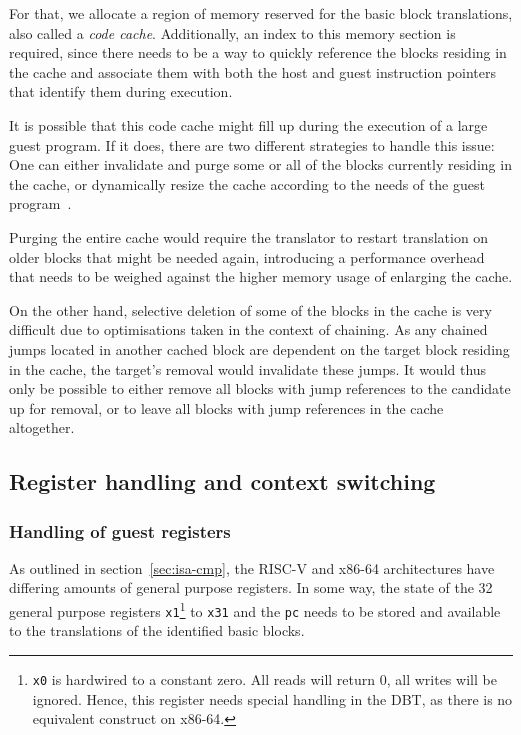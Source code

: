 For that, we allocate a region of memory reserved for the basic block translations, also called a \textit{code cache}.
Additionally, an index to this memory section is required, since there needs to be a way to quickly reference the blocks residing in the cache and associate them with both the host and guest instruction pointers that identify them during execution.


It is possible that this code cache might fill up during the execution of a large guest program.
If it does, there are two different strategies to handle this issue:
One can either invalidate and purge some or all of the blocks currently residing in the cache, or dynamically resize the cache according to the needs of the guest program~\cite[S. 3]{bintrans}.

Purging the entire cache would require the translator to restart translation on older blocks that might be needed again, introducing a performance overhead that needs to be weighed against the higher memory usage of enlarging the cache.

On the other hand, selective deletion of some of the blocks in the cache is very difficult due to optimisations taken in the context of chaining.
As any chained jumps located in another cached block are dependent on the target block residing in the cache, the target's removal would invalidate these jumps.
It would thus only be possible to either remove all blocks with jump references to the candidate up for removal, or to leave all blocks with jump references in the cache altogether.

\subsection{Register handling and context switching}
\label{sec:context-switch-reg-handle}

\subsubsection{Handling of guest registers}
As outlined in section~\ref{sec:isa-cmp}, the RISC-V and x86-64 architectures have differing amounts of general purpose registers.
In some way, the state of the 32 general purpose registers \texttt{x1}\footnote{\texttt{x0} is hardwired to a constant zero. All reads will return 0, all writes will be ignored. Hence, this register needs special handling in the DBT, as there is no equivalent construct on x86-64.} to \texttt{x31} and the \texttt{pc} needs to be stored and available to the translations of the identified basic blocks.


